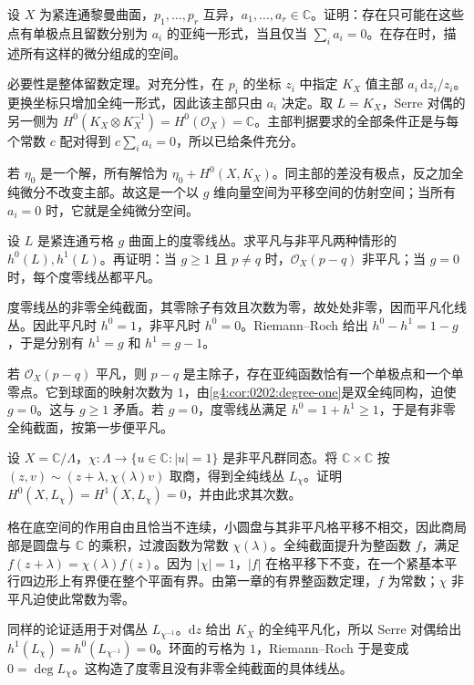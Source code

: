 \begin{exercise}
	\label{g4:ex:0303:differential-residues}
	设 \(X\) 为紧连通黎曼曲面，\(p_1,\ldots,p_r\) 互异，\(a_1,\ldots,a_r\in\mathbb C\)。证明：存在只可能在这些点有单极点且留数分别为 \(a_i\) 的亚纯一形式，当且仅当 \(\sum_i a_i=0\)。在存在时，描述所有这样的微分组成的空间。
\end{exercise}
\begin{solution}
	必要性是整体留数定理。对充分性，在 \(p_i\) 的坐标 \(z_i\) 中指定 \(K_X\) 值主部 \(a_i\,\mathrm{d}z_i/z_i\)。更换坐标只增加全纯一形式，因此该主部只由 \(a_i\) 决定。取 \(L=K_X\)，Serre 对偶的另一侧为 \(H^0(K_X\otimes K_X^{-1})=H^0(\mathcal O_X)=\mathbb C\)。主部判据要求的全部条件正是与每个常数 \(c\) 配对得到 \(c\sum_i a_i=0\)，所以已给条件充分。

	若 \(\eta_0\) 是一个解，所有解恰为 \(\eta_0+H^0(X,K_X)\)。同主部的差没有极点，反之加全纯微分不改变主部。故这是一个以 \(g\) 维向量空间为平移空间的仿射空间；当所有 \(a_i=0\) 时，它就是全纯微分空间。
\end{solution}

\begin{exercise}
	\label{g4:ex:0304:degree-zero}
	设 \(L\) 是紧连通亏格 \(g\) 曲面上的度零线丛。求平凡与非平凡两种情形的 \(h^0(L),h^1(L)\)。再证明：当 \(g\ge1\) 且 \(p\ne q\) 时，\(\mathcal O_X(p-q)\) 非平凡；当 \(g=0\) 时，每个度零线丛都平凡。
\end{exercise}
\begin{solution}
	度零线丛的非零全纯截面，其零除子有效且次数为零，故处处非零，因而平凡化线丛。因此平凡时 \(h^0=1\)，非平凡时 \(h^0=0\)。Riemann--Roch 给出 \(h^0-h^1=1-g\)，于是分别有 \(h^1=g\) 和 \(h^1=g-1\)。

	若 \(\mathcal O_X(p-q)\) 平凡，则 \(p-q\) 是主除子，存在亚纯函数恰有一个单极点和一个单零点。它到球面的映射次数为 \(1\)，由\cref{g4:cor:0202:degree-one}是双全纯同构，迫使 \(g=0\)。这与 \(g\ge1\) 矛盾。若 \(g=0\)，度零线丛满足 \(h^0=1+h^1\ge1\)，于是有非零全纯截面，按第一步便平凡。
\end{solution}

\begin{exercise}
	\label{g4:ex:0304:unitary-character}
	设 \(X=\mathbb C/\Lambda\)，\(\chi:\Lambda\to\{u\in\mathbb C:|u|=1\}\) 是非平凡群同态。将 \(\mathbb C\times\mathbb C\) 按 \((z,v)\sim(z+\lambda,\chi(\lambda)v)\) 取商，得到全纯线丛 \(L_\chi\)。证明 \(H^0(X,L_\chi)=H^1(X,L_\chi)=0\)，并由此求其次数。
\end{exercise}
\begin{solution}
	格在底空间的作用自由且恰当不连续，小圆盘与其非平凡格平移不相交，因此商局部是圆盘与 \(\mathbb C\) 的乘积，过渡函数为常数 \(\chi(\lambda)\)。全纯截面提升为整函数 \(f\)，满足 \(f(z+\lambda)=\chi(\lambda)f(z)\)。因为 \(|\chi|=1\)，\(|f|\) 在格平移下不变，在一个紧基本平行四边形上有界便在整个平面有界。由第一章的有界整函数定理，\(f\) 为常数；\(\chi\) 非平凡迫使此常数为零。

	同样的论证适用于对偶丛 \(L_{\chi^{-1}}\)。\(\mathrm{d}z\) 给出 \(K_X\) 的全纯平凡化，所以 Serre 对偶给出 \(h^1(L_\chi)=h^0(L_{\chi^{-1}})=0\)。环面的亏格为 \(1\)，Riemann--Roch 于是变成 \(0=\deg L_\chi\)。这构造了度零且没有非零全纯截面的具体线丛。
\end{solution}


